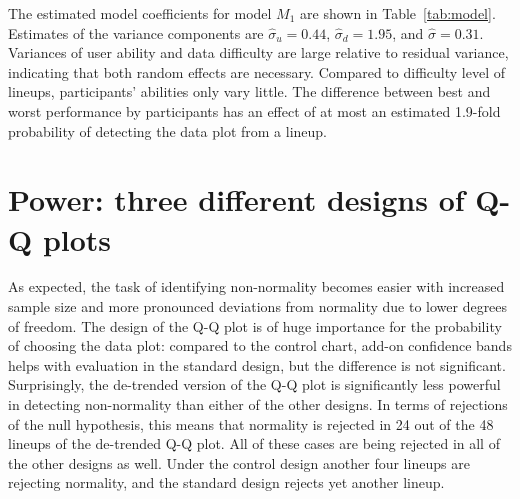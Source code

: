 \documentclass{article}\usepackage[]{graphicx}\usepackage[]{color}
\newcommand{\hh}[1]{{\color{magenta} #1}}
\begin{document}
The estimated model coefficients for model $M_1$ are shown in Table~\ref{tab:model}. 
Estimates of the variance components are $\widehat{\sigma}_u = 0.44$, $\widehat{\sigma}_d=1.95$, and $\widehat{\sigma} = 0.31$. Variances of user ability and data difficulty are large relative to residual variance, indicating that both random effects are necessary.
%
Compared to difficulty level of lineups, participants' abilities only vary little. The difference between best and worst performance by participants has an effect of at most an estimated 
1.9-fold probability of detecting the data plot from a lineup. 

\section{Power: three different designs of Q-Q plots}\label{sec:power1}

%
As expected, the task of identifying non-normality becomes easier with increased sample size and more pronounced deviations from normality due to lower degrees of freedom. The  design of the Q-Q plot is of huge importance for the probability of choosing the data plot: compared to the control chart, add-on confidence bands helps with evaluation in the standard design, but the difference is not significant.  Surprisingly, the de-trended version of the Q-Q plot is significantly less powerful in detecting non-normality than either of the other designs. 
\hh{In terms of rejections of the null hypothesis, this means that normality is rejected in 24 out of the 48 lineups of the de-trended Q-Q plot. All of these cases are being rejected in all of the other designs as well. Under the control design another four lineups are rejecting normality, and the standard design rejects yet another lineup.}
\end{document}
